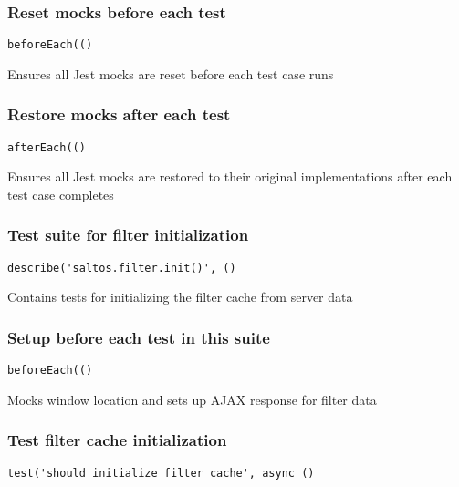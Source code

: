 \documentclass[a4paper]{article}
\begin{document}
\hypertarget{toc147}{}
\subsubsection{Reset mocks before each test}

\begin{lstlisting}
beforeEach(()
\end{lstlisting}

Ensures all Jest mocks are reset before each test case runs

\hypertarget{toc148}{}
\subsubsection{Restore mocks after each test}

\begin{lstlisting}
afterEach(()
\end{lstlisting}

Ensures all Jest mocks are restored to their original implementations
after each test case completes

\hypertarget{toc149}{}
\subsubsection{Test suite for filter initialization}

\begin{lstlisting}
describe('saltos.filter.init()', ()
\end{lstlisting}

Contains tests for initializing the filter cache from server data

\hypertarget{toc150}{}
\subsubsection{Setup before each test in this suite}

\begin{lstlisting}
beforeEach(()
\end{lstlisting}

Mocks window location and sets up AJAX response for filter data

\hypertarget{toc151}{}
\subsubsection{Test filter cache initialization}

\begin{lstlisting}
test('should initialize filter cache', async ()
\end{lstlisting}
\end{document}
